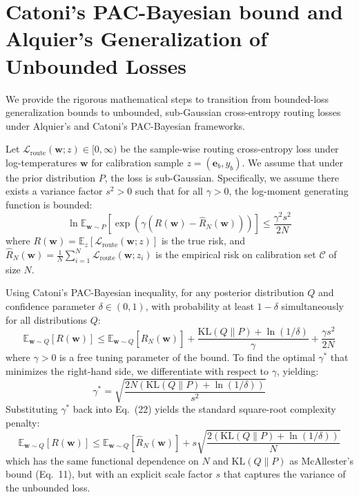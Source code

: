 \section{Catoni's PAC-Bayesian bound and Alquier's Generalization of Unbounded Losses}
\label{sec:appendix_catoni}

We provide the rigorous mathematical steps to transition from bounded-loss generalization bounds to unbounded, sub-Gaussian cross-entropy routing losses under Alquier's and Catoni's PAC-Bayesian frameworks.

Let $\mathcal{L}_{\text{route}}(\mathbf{w}; z) \in [0, \infty)$ be the sample-wise routing cross-entropy loss under log-temperatures $\mathbf{w}$ for calibration sample $z = (\mathbf{e}_b, y_b)$. We assume that under the prior distribution $P$, the loss is sub-Gaussian. Specifically, we assume there exists a variance factor $s^2 > 0$ such that for all $\gamma > 0$, the log-moment generating function is bounded:
\begin{equation}
\ln \mathbb{E}_{\mathbf{w} \sim P} \left[ \exp\left( \gamma \left( R(\mathbf{w}) - \hat{R}_N(\mathbf{w}) \right) \right) \right] \le \frac{\gamma^2 s^2}{2N}
\end{equation}
where $R(\mathbf{w}) = \mathbb{E}_z[\mathcal{L}_{\text{route}}(\mathbf{w}; z)]$ is the true risk, and $\hat{R}_N(\mathbf{w}) = \frac{1}{N} \sum_{i=1}^N \mathcal{L}_{\text{route}}(\mathbf{w}; z_i)$ is the empirical risk on calibration set $\mathcal{C}$ of size $N$.

Using Catoni's PAC-Bayesian inequality, for any posterior distribution $Q$ and confidence parameter $\delta \in (0, 1)$, with probability at least $1-\delta$ simultaneously for all distributions $Q$:
\begin{equation}
\mathbb{E}_{\mathbf{w} \sim Q} [R(\mathbf{w})] \le \mathbb{E}_{\mathbf{w} \sim Q} [\hat{R}_N(\mathbf{w})] + \frac{\text{KL}(Q \| P) + \ln(1/\delta)}{\gamma} + \frac{\gamma s^2}{2N}
\end{equation}
where $\gamma > 0$ is a free tuning parameter of the bound. To find the optimal $\gamma^*$ that minimizes the right-hand side, we differentiate with respect to $\gamma$, yielding:
\begin{equation}
\gamma^* = \sqrt{\frac{2N \left( \text{KL}(Q \| P) + \ln(1/\delta) \right)}{s^2}}
\end{equation}
Substituting $\gamma^*$ back into Eq.~(22) yields the standard square-root complexity penalty:
\begin{equation}
\mathbb{E}_{\mathbf{w} \sim Q} [R(\mathbf{w})] \le \mathbb{E}_{\mathbf{w} \sim Q} [\hat{R}_N(\mathbf{w})] + s \sqrt{\frac{2 \left( \text{KL}(Q \| P) + \ln(1/\delta) \right)}{N}}
\end{equation}
which has the same functional dependence on $N$ and $\text{KL}(Q \| P)$ as McAllester's bound (Eq.~11), but with an explicit scale factor $s$ that captures the variance of the unbounded loss.

